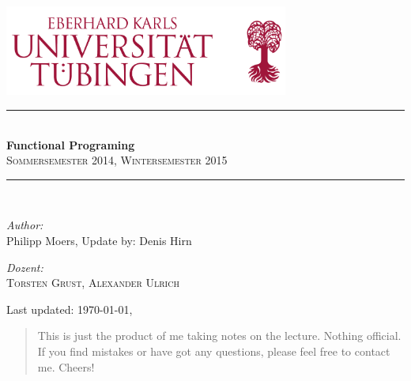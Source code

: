\documentclass[12pt,a4paper]{article}
\begin{document}

\begin{titlepage}
    \begin{center}
        \includegraphics[width=0.7\textwidth]{logo-uni-tuebingen}\\[1cm]

        \newcommand{\HRule}{\rule{\linewidth}{0.5mm}} \HRule \\[0.4cm]
        { \huge \bfseries Functional Programing}\\[0.4cm]

        \textsc{\Large Sommersemester 2014, Wintersemester 2015}\\[0.5cm]
        \HRule \\[1.5cm]

        \begin{minipage}{0.4\textwidth}
            \begin{flushleft}
                \large \emph{Author:}\\ Philipp Moers, Update by: Denis Hirn
            \end{flushleft}
        \end{minipage}
            \hfill
        \begin{minipage}{0.4\textwidth}
            \begin{flushright}
                \large \emph{Dozent:} \\ \scshape{Torsten Grust, Alexander Ulrich}
            \end{flushright}
        \end{minipage}

        \vfill
        {Last updated: \today, \currenttime}
    \end{center}
\end{titlepage}

\begin{abstract}
    This is just the product of me taking notes on the lecture. Nothing official. If you find mistakes or have got any questions, please feel free to contact me. Cheers!
\end{abstract}


\tableofcontents
\end{document}
